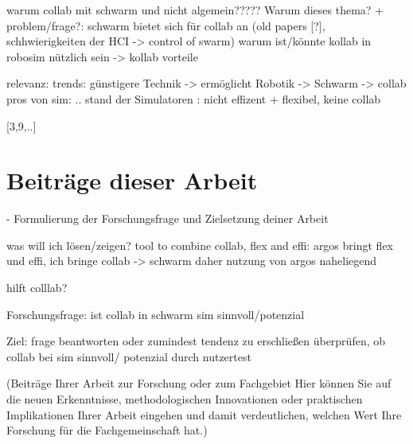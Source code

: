 \documentclass[german,version-2020-11]{uzl-thesis}
\begin{document}
      \begin{Code}

      warum collab mit schwarm und nicht algemein?????
        Warum dieses thema? + problem/frage?:
      schwarm bietet sich für collab an  (old papers [?], schhwierigkeiten der HCI -> control of swarm)
      warum ist/könnte kollab in robosim nützlich sein -> kollab vorteile

      relevanz:
      trends: günstigere Technik -> ermöglicht Robotik -> Schwarm -> collab
      pros von sim: ..
      stand der Simulatoren : nicht effizent + flexibel, keine collab

      [3,9,..]

    


      \end{Code}







\section{Beiträge dieser Arbeit}

%

- Formulierung der Forschungsfrage und Zielsetzung deiner Arbeit

was will ich lösen/zeigen?
tool to combine collab, flex and effi:
argos bringt flex und effi,
ich bringe collab
-> schwarm daher nutzung von argos naheliegend

hilft colllab?

      Forschungsfrage: ist collab in schwarm sim sinnvoll/potenzial

      Ziel: frage beantworten oder zumindest tendenz zu erschließen
        überprüfen, ob collab bei sim sinnvoll/ potenzial durch nutzertest


(Beiträge Ihrer Arbeit zur Forschung oder zum Fachgebiet 
Hier können Sie auf die neuen Erkenntnisse, methodologischen Innovationen oder praktischen Implikationen Ihrer Arbeit 
eingehen und damit verdeutlichen, welchen Wert Ihre Forschung für die Fachgemeinschaft hat.)
\end{document}
